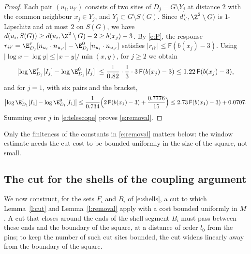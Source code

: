 \begin{proof}
Each pair $(u_i, u_{i'})$ consists of two sites of $D_j = G \setminus Y_j$ at distance $2$ with the common neighbour $x_j \in Y_j$, and $Y_j \subset G \setminus S(G)$. Since $d(\cdot, \Z^2 \setminus G)$ is $1$-Lipschitz and at most $2$ on $S(G)$, we have $d(u_i, S(G)) \ge d(u_i, \Z^2 \setminus G) - 2 \ge b(x_j) - 3$. By \eqref{e:P}, the response $r_{ii'} = \E^\tau_{D_j}[n_{u_i} \cdot n_{u_{i'}}] - \E^0_{D_j}[n_{u_i} \cdot n_{u_{i'}}]$ satisfies $|r_{ii'}| \le \mathsf F(b(x_j) - 3)$. Using $|\log x - \log y| \le |x - y| / \min(x, y)$, for $j \ge 2$ we obtain
\begin{equation*}
\bigl| \log \E^\tau_{D_j}[I_j] - \log \E^0_{D_j}[I_j] \bigr| \le \frac{1}{0.82} \cdot \frac{1}{3} \cdot 3 \, \mathsf F(b(x_j) - 3) \le 1.22 \, \mathsf F(b(x_j) - 3),
\end{equation*}
and for $j = 1$, with six pairs and the bracket,
\begin{equation*}
\bigl| \log \E^\tau_{D_1}[I_1] - \log \E^0_{D_1}[I_1] \bigr| \le \frac{1}{0.734} \Bigl( 2 \, \mathsf F(b(x_1) - 3) + \frac{0.7776}{15} \Bigr) \le 2.73 \, \mathsf F(b(x_1) - 3) + 0.0707 .
\end{equation*}
Summing over $j$ in \eqref{e:telescope} proves \eqref{e:removal}.
\end{proof}

Only the finiteness of the constants in \eqref{e:removal} matters below: the window estimate needs the cut cost to be bounded uniformly in the size of the square, not small.

\subsection{The cut for the shells of the coupling argument}\label{s:cutgeom}

We now construct, for the sets $F_i$ and $B_i$ of \eqref{e:shells}, a cut to which Lemma~\ref{l:cut} and Lemma~\ref{l:removal} apply with a cost bounded uniformly in $M$. A cut that closes around the ends of the shell segment $B_i$ must pass between these ends and the boundary of the square, at a distance of order $l_0$ from the pins; to keep the number of such cut sites bounded, the cut widens linearly away from the boundary of the square.

